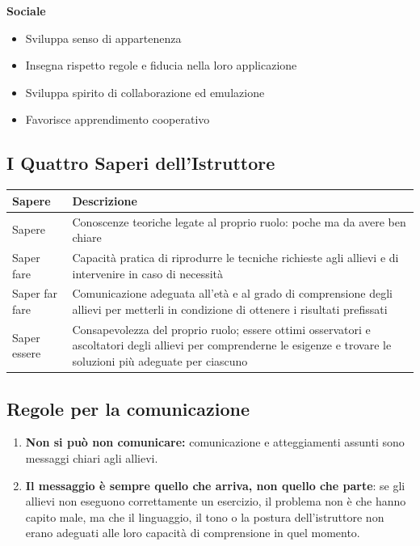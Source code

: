 \documentclass[12pt, a4paper]{article}
\begin{document}
\noindent\textbf{Sociale}
\begin{itemize}
  \item Sviluppa senso di appartenenza
  \item Insegna rispetto regole e fiducia nella loro applicazione
  \item Sviluppa spirito di collaborazione ed emulazione
  \item Favorisce apprendimento cooperativo
\end{itemize}

\subsection{I Quattro Saperi dell'Istruttore}

\begin{tabularx}{\textwidth}{lX}
\toprule
\rowcolor{light} \textbf{Sapere} & \textbf{Descrizione} \\
\midrule
Sapere & Conoscenze teoriche legate al proprio ruolo: poche ma da avere ben chiare \\
Saper fare & Capacità pratica di riprodurre le tecniche richieste agli allievi e di intervenire in caso di necessità \\
Saper far fare & Comunicazione adeguata all'età e al grado di comprensione degli allievi per metterli in condizione di ottenere i risultati prefissati \\
Saper essere & Consapevolezza del proprio ruolo; essere ottimi osservatori e ascoltatori degli allievi per comprenderne le esigenze e trovare le soluzioni più adeguate per ciascuno \\
\bottomrule
\end{tabularx}

\subsection{Regole per la comunicazione}

\begin{enumerate}
  \item \textbf{Non si può non comunicare:} comunicazione e atteggiamenti assunti sono messaggi chiari agli allievi.
  \item \textbf{Il messaggio è sempre quello che arriva, non quello che parte}: se gli allievi non eseguono correttamente un esercizio, il problema non è che hanno capito male, ma che il linguaggio, il tono o la postura dell'istruttore non erano adeguati alle loro capacità di comprensione in quel momento.
\end{enumerate}
\end{document}
